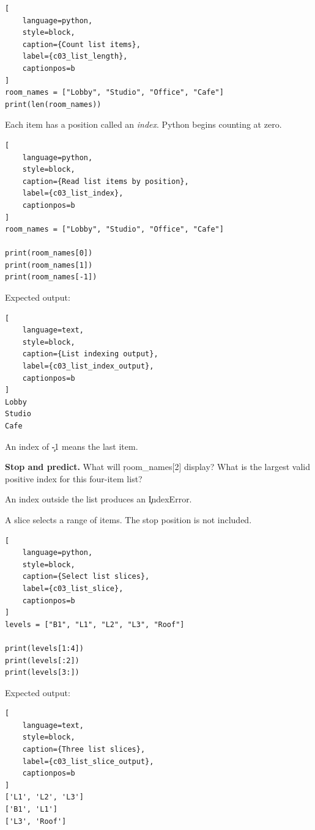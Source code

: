 \begin{lstlisting}[
    language=python,
    style=block,
    caption={Count list items},
    label={c03_list_length},
    captionpos=b
]
room_names = ["Lobby", "Studio", "Office", "Cafe"]
print(len(room_names))
\end{lstlisting}


Each item has a position called an \emph{index}. Python begins counting at
zero.

\begin{lstlisting}[
    language=python,
    style=block,
    caption={Read list items by position},
    label={c03_list_index},
    captionpos=b
]
room_names = ["Lobby", "Studio", "Office", "Cafe"]

print(room_names[0])
print(room_names[1])
print(room_names[-1])
\end{lstlisting}

Expected output:

\begin{lstlisting}[
    language=text,
    style=block,
    caption={List indexing output},
    label={c03_list_index_output},
    captionpos=b
]
Lobby
Studio
Cafe
\end{lstlisting}

An index of \c{-1} means the last item.

\begin{NoteBox}
\textbf{Stop and predict.} What will \c{room_names[2]} display? What is the
largest valid positive index for this four-item list?
\end{NoteBox}

An index outside the list produces an \c{IndexError}.


A slice selects a range of items. The stop position is not included.

\begin{lstlisting}[
    language=python,
    style=block,
    caption={Select list slices},
    label={c03_list_slice},
    captionpos=b
]
levels = ["B1", "L1", "L2", "L3", "Roof"]

print(levels[1:4])
print(levels[:2])
print(levels[3:])
\end{lstlisting}

Expected output:

\begin{lstlisting}[
    language=text,
    style=block,
    caption={Three list slices},
    label={c03_list_slice_output},
    captionpos=b
]
['L1', 'L2', 'L3']
['B1', 'L1']
['L3', 'Roof']
\end{lstlisting}

